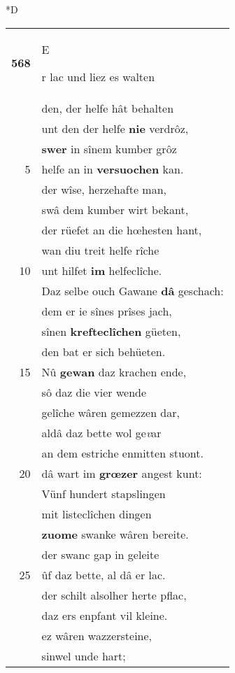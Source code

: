 \documentclass[8pt,a4paper,notitlepage]{article}
\begin{document}
\begin{table}[ht]
\begin{minipage}[t]{0.5\linewidth}
\small
\begin{center}*D
\end{center}
\begin{tabular}{rl}
\textbf{568} & \begin{large}E\end{large}r lac und liez es walten\\ 
 & den, der helfe hât behalten\\ 
 & unt den der helfe \textbf{nie} verdrôz,\\ 
 & \textbf{swer} in sînem kumber grôz\\ 
5 & helfe an in \textbf{versuochen} kan.\\ 
 & der wîse, herzehafte man,\\ 
 & swâ dem kumber wirt bekant,\\ 
 & der rüefet an die hœhesten hant,\\ 
 & wan diu treit helfe rîche\\ 
10 & unt hilfet \textbf{im} helfeclîche.\\ 
 & Daz selbe ouch Gawane \textbf{dâ} geschach:\\ 
 & dem er ie sînes prîses jach,\\ 
 & sînen \textbf{krefteclîchen} güeten,\\ 
 & den bat er sich behüeten.\\ 
15 & Nû \textbf{gewan} daz krachen ende,\\ 
 & sô daz die vier wende\\ 
 & gelîche wâren gemezzen dar,\\ 
 & aldâ daz bette wol ge\textit{v}ar\\ 
 & an dem estriche enmitten stuont.\\ 
20 & dâ wart im \textbf{grœzer} angest kunt:\\ 
 & Vünf hundert stapslingen\\ 
 & mit listeclîchen dingen\\ 
 & \textbf{zuome} swanke wâren bereite.\\ 
 & der swanc gap in geleite\\ 
25 & ûf daz bette, al dâ er lac.\\ 
 & der schilt alsolher herte pflac,\\ 
 & daz ers enpfant vil kleine.\\ 
 & ez wâren wazzersteine,\\ 
 & sinwel unde hart;\\ 

\end{tabular}
\end{minipage}
\end{table}
\end{document}
